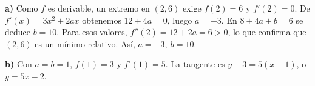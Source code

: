 \textbf{a)} Como $f$ es derivable, un extremo en $(2,6)$ exige
$f(2)=6$ y $f'(2)=0$. De $f'(x)=3x^2+2ax$ obtenemos
$12+4a=0$, luego $a=-3$. En $8+4a+b=6$ se deduce $b=10$.
Para esos valores, $f''(2)=12+2a=6>0$, lo que confirma
que $(2,6)$ es un mínimo relativo. Así, $\boxed{a=-3,\ b=10}$.

\textbf{b)} Con $a=b=1$, $f(1)=3$ y $f'(1)=5$.
La tangente es $y-3=5(x-1)$, o $\boxed{y=5x-2}$.

